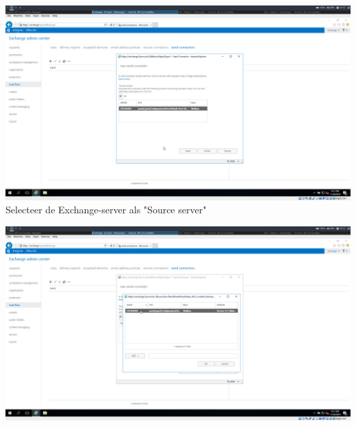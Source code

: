 \documentclass[a4paper]{article}
\begin{document}
\begin{center}
	\includegraphics[width=15cm]{Pictures/Exchange/config/1543425170.png}
	Selecteer de Exchange-server als "Source server"
\end{center}
\begin{center}
	\includegraphics[width=15cm]{Pictures/Exchange/config/1543425167.png}
\end{center}
\end{document}
